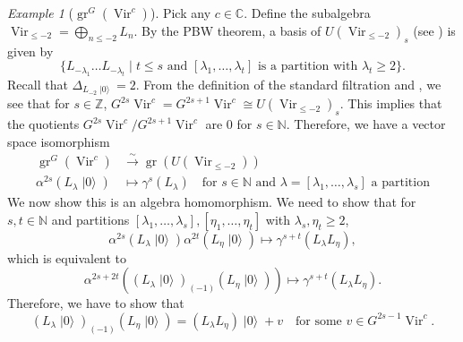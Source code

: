 \documentclass[a4paper, 12pt, reqno]{amsart}
\theoremstyle{remark}
\newtheorem{example}[theorem]{Example}
\numberwithin{equation}{subsection}
\DeclareMathOperator{\Vir}{Vir}
\DeclareMathOperator{\gr}{gr}
\DeclareMathOperator{\vac}{|0\rangle}
\begin{document}
\begin{example}[$\gr^G(\Vir^c)$]
  \label{exa:11}
  Pick any $c \in \mathbb{C}$.
  Define the subalgebra $\Vir_{\le -2} = \bigoplus_{n \le -2} L_{n}$.
  By the PBW theorem, a basis of $U(\Vir_{\le -2})_s$ (see ) is given by
  \begin{equation*}
    \{L_{-\lambda_1}\dots L_{-\lambda_t} \mid t \le s\text{ and }[\lambda_1, \dots, \lambda_t]\text{ is a partition with } \lambda_t \ge 2\}.
  \end{equation*}
  Recall that $\Delta_{L_{-2}\vac} = 2$.
  From the definition of the standard filtration and , we see that for $s \in \mathbb{Z}$, $G^{2s}\Vir^c = G^{2s + 1}\Vir^c \cong U(\Vir_{\le -2})_s$.
  This implies that the quotients $G^{2s}\Vir^c/G^{2s + 1}\Vir^c$ are $0$ for $s \in \mathbb{N}$.
  Therefore, we have a vector space isomorphism
  \begin{align*}
    \gr^G(\Vir^c) &\xrightarrow{\sim} \gr(U(\Vir_{\le -2})) \\
    \alpha^{2s}(L_{\lambda}\vac) &\mapsto \gamma^s(L_{\lambda}) \quad \text{for }s \in \mathbb{N}\text{ and }\lambda = [\lambda_1, \dots, \lambda_s] \text{ a partition}
  \end{align*}
  We now show this is an algebra homomorphism.
  We need to show that for $s, t \in \mathbb{N}$ and partitions $[\lambda_1, \dots, \lambda_s], [\eta_1, \dots, \eta_t]$ with $\lambda_s, \eta_t \ge 2$,
  \begin{equation*}
    \alpha^{2s}(L_{\lambda}\vac)\alpha^{2t}(L_{\eta}\vac) \mapsto \gamma^{s + t}(L_{\lambda}L_{\eta}),
  \end{equation*}
  which is equivalent to
  \begin{equation*}
    \alpha^{2s + 2t}((L_{\lambda}\vac)_{(-1)}(L_{\eta}\vac)) \mapsto \gamma^{s + t}(L_{\lambda}L_{\eta}).
  \end{equation*}
  Therefore, we have to show that
  \begin{equation}
    \label{eq:43}
    (L_{\lambda}\vac)_{(-1)}(L_{\eta}\vac) = (L_{\lambda}L_{\eta})\vac + v \quad \text{for some }v \in G^{2s - 1}\Vir^c.
  \end{equation}


\end{example}
\end{document}
